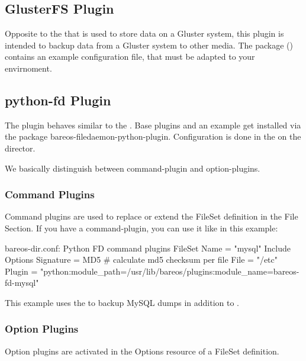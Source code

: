\subsection{GlusterFS Plugin}

Opposite to the  that is used to store data on a Gluster system,
this plugin is intended to backup data from a Gluster system to other media.
The package  () contains an example configuration file, that must be adapted to your envirnoment.


\subsection{python-fd Plugin}

The  plugin behaves similar to the . Base plugins and an example get installed via the package bareos-filedaemon-python-plugin.
Configuration is done in the  on the director.

We basically distinguish between command-plugin and option-plugins. 

\subsubsection{Command Plugins}
Command plugins are used to replace or extend the FileSet definition in the File Section. If you have a command-plugin, 
you can use it like in this example:

\begin{bconfig}{bareos-dir.conf: Python FD command plugins}
FileSet {
  Name = "mysql"
  Include {
    Options {
      Signature = MD5 # calculate md5 checksum per file
    }
    File = "/etc"
    Plugin = "python:module_path=/usr/lib/bareos/plugins:module_name=bareos-fd-mysql"
  }
} 
\end{bconfig}

This example uses the  to backup MySQL dumps in addition to .

\subsubsection{Option Plugins}
Option plugins are activated in the Options resource of a FileSet definition.

